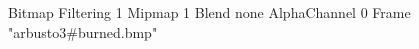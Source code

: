 {Bitmap
	{Filtering 1}
	{Mipmap 1}
	{Blend none}
	{AlphaChannel 0}
	{Frame "arbusto3#burned.bmp"}
}
